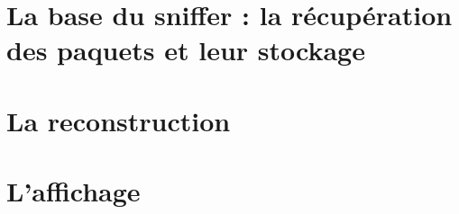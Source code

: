 \section{La base du sniffer : la récupération des paquets et leur stockage}

\section{La reconstruction}


\section{L'affichage}


